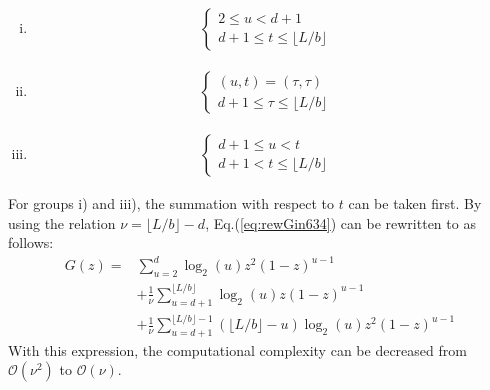 ﻿\documentclass[a3paper,xelatex,english]{bxjsarticle}
\begin{document}
\begin{enumerate}[i)]
	\item 
	\begin{align}
	\begin{cases}
		2 \leq u < d + 1 & \\
		d + 1 \leq t \leq \lfloor L / b \rfloor & 
	\end{cases}
	\label{eq:zone1_634}
	\end{align}
	\item 
	\begin{align}
	\begin{cases}
		(u, t) = (\tau, \tau) & \\
		d + 1 \leq \tau \leq \lfloor L / b \rfloor & 
	\end{cases}
	\label{eq:zone2_634}
	\end{align}
	\item 
	\begin{align}
	\begin{cases}
		d + 1 \leq u < t & \\
		d + 1 < t \leq \lfloor L / b \rfloor & 
	\end{cases}
	\label{eq:zone3_634}
	\end{align}
\end{enumerate}

For groups i) and iii), the summation with respect to $t$ can be taken first.
By using the relation $\nu = \lfloor L / b \rfloor - d$, Eq.(\ref{eq:rewGin634}) can be rewritten to as follows:
\begin{align}
G(z) =
& \sum_{u = 2}^{d} \log_{2}(u) z^{2} (1-z)^{u-1} \nonumber \\
& + \frac{1}{\nu} \sum_{u = d + 1}^{\lfloor L / b \rfloor} \log_{2}(u) z (1-z)^{u-1} \nonumber \\
& + \frac{1}{\nu} \sum_{u = d + 1}^{\lfloor L / b \rfloor - 1} (\lfloor L / b \rfloor - u) \log_{2}(u) z^{2} (1-z)^{u-1}
\label{eq:rewGin634performance}
\end{align}
With this expression, the computational complexity can be decreased from $\mathcal{O}(\nu^2)$ to $\mathcal{O}(\nu)$.

\clearpage
\end{document}
